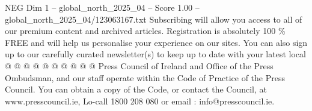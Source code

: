 \begin{textsample}{NEG Dim 1 – global\_north\_2025\_04 – Score 1.00 – global\_north\_2025\_04/123063167.txt}
Subscribing will allow you access to all of our premium content and archived articles.
Registration is absolutely 100 \% FREE and will help us personalise your experience on our sites.
You can also sign up to our carefully curated newsletter(s) to keep up to date with your latest local @ @ @ @ @ @ @ @ @ @ Press Council of Ireland and Office of the Press Ombudsman, and our staff operate within the Code of Practice of the Press Council.
You can obtain a copy of the Code, or contact the Council, at www.presscouncil.ie, Lo-call 1800 208 080 or email : info@presscouncil.ie.

\end{textsample}
